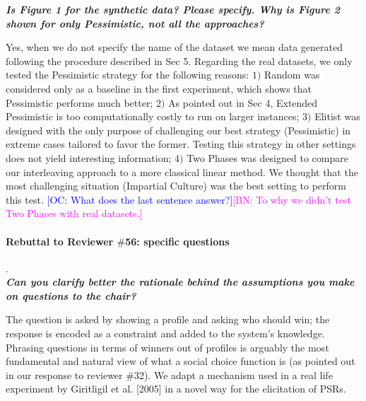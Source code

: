 \documentclass{article}
\newcommand{\commentOC}[1]{\textcolor{blue}{\small$\big[$OC: #1$\big]$}}
\newcommand{\commentBN}[1]{\textcolor{magenta}{\small$\big[$BN: #1$\big]$}}
\begin{document}

\textit{\textbf{Is Figure 1 for the synthetic data? Please specify. Why is Figure 2 shown for only Pessimistic, not all the approaches?}}

Yes, when we do not specify the name of the dataset we mean data generated following the procedure described in Sec 5. Regarding the real datasets, we only tested the Pessimistic strategy for the following reasons: $1)$ Random was considered only as a baseline in the first experiment, which shows that Pessimistic performs much better; $2)$ As pointed out in Sec 4, Extended Pessimistic is too computationally costly to run on larger instances; $3)$ Elitist was designed with the only purpose of challenging our best strategy (Pessimistic) in extreme cases tailored to favor the former. Testing this strategy in other settings does not yield interesting information; $4)$ Two Phases was designed to compare our interleaving approach to a more classical linear method. We thought that the most challenging situation (Impartial Culture) was the best setting to perform this test. \commentOC{What does the last sentence answer?}\commentBN{To why we didn't test Two Phases with real datasets.}



\paragraph{Rebuttal to Reviewer $\#$56: specific questions}.\\
\textit{\textbf{Can you clarify better the rationale behind the assumptions you make on questions to the chair?}}

The question is asked by showing a profile and asking who should win; the response is encoded as a constraint and added to the system’s knowledge. Phrasing questions in terms of winners out of profiles is arguably the most fundamental and natural view of what a social choice function is (as pointed out in our response to reviewer $\#$32). We adapt a mechanism used in a real life experiment by Giritligil et al. [2005] in a novel way for the elicitation of PSRs.
\end{document}
